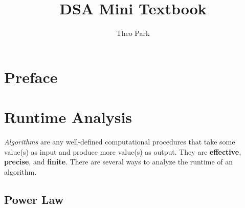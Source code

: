 \documentclass{report}
\title{DSA Mini Textbook}
\author{Theo Park}
\date{}
\begin{document}
\maketitle

\pagestyle{fancy}


\tableofcontents


\chapter*{Preface}


\chapter{Runtime Analysis}

\textit{Algorithms} are any well-defined computational procedures that take some value(s) as input and produce more value(s) as output. They are \textbf{effective}, \textbf{precise}, and \textbf{finite}. There are several ways to analyze the runtime of an algorithm.

\section{Power Law}
\end{document}
